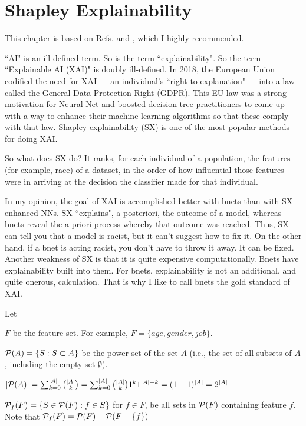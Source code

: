\chapter{Shapley Explainability}

This chapter
is based on 
Refs.\cite{maz-shap-titanic}
and \cite{maz-shap-income},
which I highly recommended.


\label{ch-shapley}
``AI" is an ill-defined term. 
So is the term ``explainability". 
So the term ``Explainable 
AI (XAI)" is doubly ill-defined.
In 2018, the European Union codified 
the need for XAI ---
an individual’s ``right to
 explanation" ---
into a law called the General Data Protection 
Right (GDPR). This EU law was a strong 
motivation for Neural Net  
and boosted decision tree practitioners 
to come up with a way to enhance  
their machine learning algorithms
so that these comply with that law. Shapley 
explainability (SX) is 
one of the most popular 
methods for doing XAI.

So what does SX do? It ranks, for each individual 
of a population, the features (for example, race)
of a dataset, in the order of how influential those
features were in arriving at the decision the 
classifier made for that individual.

In my opinion, the goal of XAI is 
accomplished better with
bnets
 than with SX enhanced NNs.
SX ``explains", a posteriori, the outcome of a model, 
whereas bnets reveal the a priori process whereby 
that outcome was reached. Thus, SX can tell you 
that a model is racist, but it can't suggest 
how to fix it. On the other hand, if a bnet 
is acting racist, you don't have to throw it away. 
It can be fixed. 
Another
weakness of SX is that
it is quite expensive
computationally.
Bnets have explainability
built into them.
For bnets, explainability is
not an additional, and quite
onerous, calculation.
That is why I like to call 
bnets the gold standard of XAI.

Let

$F$ be the feature set. For example,
$F=\{age, gender, job\}$. 

${\cal P}(A)=
\{S: S\subset A \}$ be the power 
set of the set $A$ (i.e., the
set of all subsets of $A$, including
the empty set $\emptyset$).

$|{\cal P}(A)|=\sum_{k=0}^{|A|} {|A|\choose k} =
\sum_{k=0}^{|A|} {|A|\choose k}1^k 1^{|A|-k}
= (1+1)^{|A|}=2^{|A|}$


${\cal P}_f(F)=\{S\in {\cal P}(F): f\in S\}$
for $f\in F$, be all sets in ${\cal P}(F)$
containing feature $f$. Note that 
 ${\cal P}_f(F)= {\cal P}(F)-{\cal P}(F-\{f\})$

